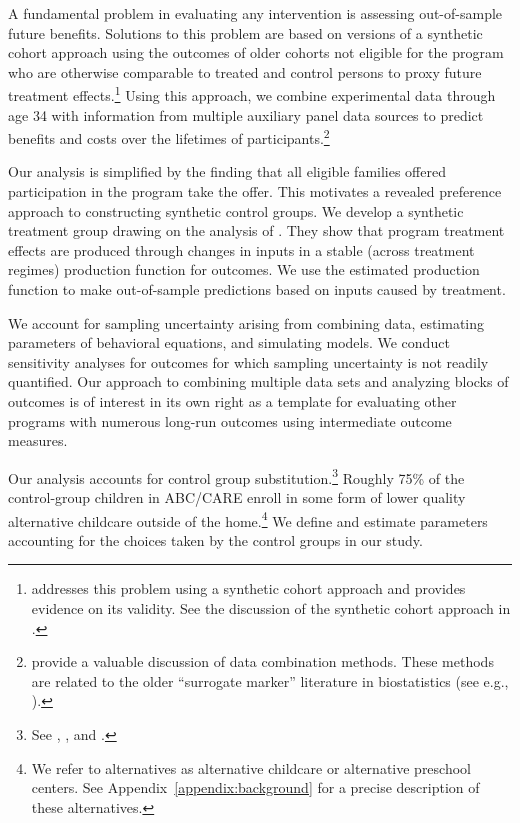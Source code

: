 A fundamental problem in evaluating any intervention is assessing out-of-sample future benefits. Solutions to this problem are based on versions of a synthetic cohort approach using the outcomes of older cohorts not eligible for the program who are otherwise comparable to treated and control persons to proxy future treatment effects.\footnote{\cite{Mincer_1974_schooling} addresses this problem using a synthetic cohort approach and provides evidence on its validity. See the discussion of the synthetic cohort approach in \cite{Heckman_Lochner_ea_2006_HEE}.} Using this approach, we combine experimental data through age 34 with information from multiple auxiliary panel data sources to predict benefits and costs over the lifetimes of participants.\footnote{\citet{Ridder_Moffitt_2007_hbk_metricsdata} provide a valuable discussion of data combination methods. These methods are related to the older ``surrogate marker'' literature in biostatistics (see e.g., \citealp{Prentice_1989_Surrogate_SiM}).}

Our analysis is simplified by the finding that all eligible families offered participation in the program take the offer. This motivates a revealed preference approach to constructing synthetic control groups. We develop a synthetic treatment group drawing on the analysis of \citet{Heckman_Pinto_etal_2013_PerryFactor}. They show that program treatment effects are produced through changes in inputs in a stable (across treatment regimes) production function for outcomes. We use the estimated production function to make out-of-sample predictions based on inputs caused by treatment.

We account for sampling uncertainty arising from combining data, estimating parameters of behavioral equations, and simulating models. We conduct sensitivity analyses for outcomes for which sampling uncertainty is not readily quantified. Our approach to combining multiple data sets and analyzing blocks of outcomes is of interest in its own right as a template for evaluating other programs with numerous long-run outcomes using intermediate outcome measures.

Our analysis accounts for control group substitution.\footnote{See \cite{Heckman_1992_randomization}, \cite{Heckman_Hohmann_etal_2000_QJE}, and \cite{Kline_Walters_2016_QJE}.} Roughly 75\% of the control-group children in ABC/CARE enroll in some form of lower quality alternative childcare outside of the home.\footnote{We refer to alternatives as alternative childcare or alternative preschool centers. See Appendix~\ref{appendix:background} for a precise description of these alternatives.} We define and estimate parameters accounting for the choices taken by the control groups in our study.


